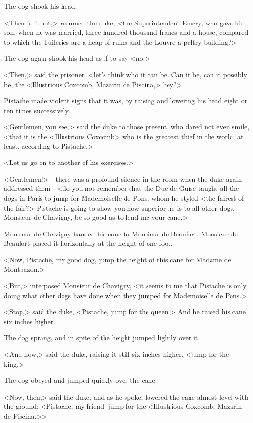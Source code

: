 The dog shook his head.

<Then is it not,> resumed the duke, <the Superintendent Emery, who gave his son, when he was married, three hundred thousand francs and a house, compared to which the Tuileries are a heap of ruins and the Louvre a paltry building?>

The dog again shook his head as if to say <no.>

<Then,> said the prisoner, <let's think who it can be. Can it be, can it possibly be, the <Illustrious Coxcomb, Mazarin de Piscina,> hey?>

Pistache made violent signs that it was, by raising and lowering his head eight or ten times successively.

<Gentlemen, you see,> said the duke to those present, who dared not even smile, <that it is the <Illustrious Coxcomb> who is the greatest thief in the world; at least, according to Pistache.>

<Let us go on to another of his exercises.>

<Gentlemen!>—there was a profound silence in the room when the duke again addressed them—<do you not remember that the Duc de Guise taught all the dogs in Paris to jump for Mademoiselle de Pons, whom he styled <the fairest of the fair?> Pistache is going to show you how superior he is to all other dogs. Monsieur de Chavigny, be so good as to lend me your cane.>

Monsieur de Chavigny handed his cane to Monsieur de Beaufort. Monsieur de Beaufort placed it horizontally at the height of one foot.

<Now, Pistache, my good dog, jump the height of this cane for Madame de Montbazon.>

<But,> interposed Monsieur de Chavigny, <it seems to me that Pistache is only doing what other dogs have done when they jumped for Mademoiselle de Pons.>

<Stop,> said the duke, <Pistache, jump for the queen.> And he raised his cane six inches higher.

The dog sprang, and in spite of the height jumped lightly over it.

<And now,> said the duke, raising it still six inches higher, <jump for the king.>

The dog obeyed and jumped quickly over the cane.

<Now, then,> said the duke, and as he spoke, lowered the cane almost level with the ground; <Pistache, my friend, jump for the <Illustrious Coxcomb, Mazarin de Piscina.>>

